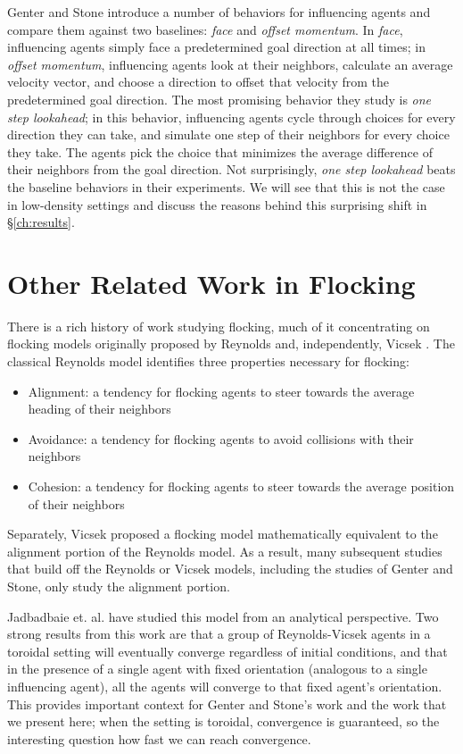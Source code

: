 Genter and Stone introduce a number of behaviors for influencing agents and
compare them against two baselines: \textit{face} and \textit{offset momentum}.
In \textit{face}, influencing agents simply face a predetermined goal direction
at all times; in \textit{offset momentum}, influencing agents look at their
neighbors, calculate an average velocity vector, and choose a direction to
offset that velocity from the predetermined goal direction.
The most promising behavior they study is \textit{one step lookahead}; in this
behavior, influencing agents cycle through choices for every direction they
can take, and simulate one step of their neighbors for every choice they take.
The agents pick the choice that minimizes the average difference of their
neighbors from the goal direction.
Not surprisingly, \textit{one step lookahead} beats the baseline behaviors in
their experiments.
We will see that this is not the case in low-density settings and discuss the
reasons behind this surprising shift in \S\ref{ch:results}.

\section{Other Related Work in Flocking}
There is a rich history of work studying flocking, much of it concentrating on
flocking models originally proposed by Reynolds \cite{reynoldsmodel} and,
independently, Vicsek \cite{vicsek1995}.
The classical Reynolds model identifies three properties necessary for
flocking:
\begin{itemize}
    \item Alignment: a tendency for flocking agents to steer towards the
            average heading of their neighbors
    \item Avoidance: a tendency for flocking agents to avoid collisions with
            their neighbors
    \item Cohesion: a tendency for flocking agents to steer towards the average
            position of their neighbors
\end{itemize}
\noindent Separately, Vicsek proposed a flocking model mathematically
equivalent to the alignment portion of the Reynolds model.
As a result, many subsequent studies that build off the Reynolds or Vicsek
models, including the studies of Genter and Stone, only study the alignment
portion.

Jadbadbaie et. al. \cite{jad2003convergence} have studied this model from an
analytical perspective.
Two strong results from this work are that a group of Reynolds-Vicsek agents
in a toroidal setting will eventually converge regardless of initial
conditions, and that in the presence of a single agent with fixed orientation
(analogous to a single influencing agent), all the agents will converge to that
fixed agent's orientation.
This provides important context for Genter and Stone's work and the work that
we present here; when the setting is toroidal, convergence is guaranteed, so
the interesting question how fast we can reach convergence.

